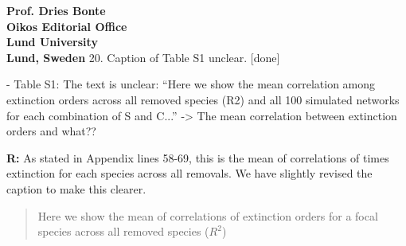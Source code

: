 \documentclass[12pt]{letter}
\begin{document}
\begin{letter}{\bf Prof. Dries Bonte\\
Oikos Editorial Office \\
Lund University \\
Lund, Sweden}
    20. Caption of Table S1 unclear. [done]

      - Table S1: The text is unclear: ``Here we show the mean correlation among
      extinction orders across all removed species (R2) and all 100 simulated networks for each combination of S and C...'' -> The mean correlation between extinction orders and what??


      \textbf{R:} As stated in Appendix lines 58-69, this is the mean of correlations of times extinction for each species across all removals. We have slightly revised the caption to make this clearer.


      \begin{quotation}
        Here we show the mean of correlations of extinction orders for a focal species across all removed species ($R^2$)
      \end{quotation}


\end{letter}

\clearpage
     
\end{document}
